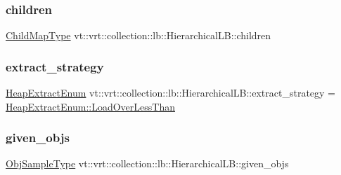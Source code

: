 \subsubsection{\texorpdfstring{children}{children}}
{\footnotesize\ttfamily \hyperlink{structvt_1_1vrt_1_1collection_1_1lb_1_1_hierarchical_l_b_a95e5a93033703216cad8ec7a3da7a2ef}{Child\+Map\+Type} vt\+::vrt\+::collection\+::lb\+::\+Hierarchical\+L\+B\+::children\hspace{0.3cm}{\ttfamily [private]}}

\mbox{\label{structvt_1_1vrt_1_1collection_1_1lb_1_1_hierarchical_l_b_a3bbe0e2597f6c01024f058d20ae9d26e}} 
\subsubsection{\texorpdfstring{extract\+\_\+strategy}{extract\_strategy}}
{\footnotesize\ttfamily \hyperlink{namespacevt_1_1vrt_1_1collection_1_1lb_aeb0f47cf4b89bed7ea05462d0c2e5b5e}{Heap\+Extract\+Enum} vt\+::vrt\+::collection\+::lb\+::\+Hierarchical\+L\+B\+::extract\+\_\+strategy = \hyperlink{namespacevt_1_1vrt_1_1collection_1_1lb_aeb0f47cf4b89bed7ea05462d0c2e5b5ea41a33133c182e43b9dfc2599f39eaa94}{Heap\+Extract\+Enum\+::\+Load\+Over\+Less\+Than}\hspace{0.3cm}{\ttfamily [private]}}

\mbox{\label{structvt_1_1vrt_1_1collection_1_1lb_1_1_hierarchical_l_b_a010367d94903aa52b9e48ecc715820c6}} 
\subsubsection{\texorpdfstring{given\+\_\+objs}{given\_objs}}
{\footnotesize\ttfamily \hyperlink{structvt_1_1vrt_1_1collection_1_1lb_1_1_load_sampler_base_l_b_a8d939a849ec0d6371c1c4d441ffb9b94}{Obj\+Sample\+Type} vt\+::vrt\+::collection\+::lb\+::\+Hierarchical\+L\+B\+::given\+\_\+objs\hspace{0.3cm}{\ttfamily [private]}}

